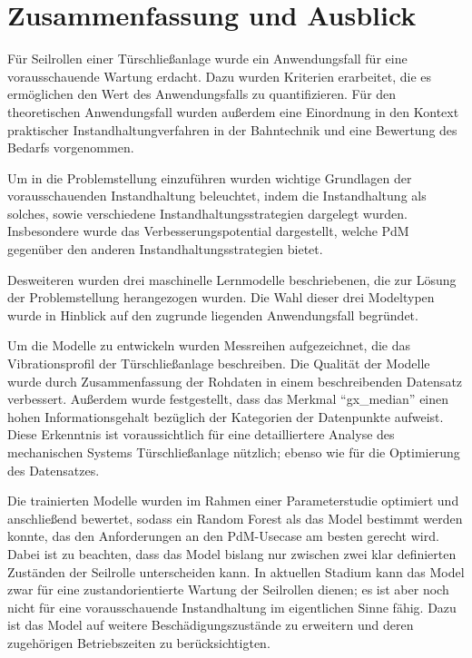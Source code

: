 \chapter{Zusammenfassung und Ausblick}
\label{ch:fazit}
Für Seilrollen einer Türschließanlage wurde ein Anwendungsfall für eine vorausschauende Wartung erdacht. Dazu wurden Kriterien erarbeitet, die es ermöglichen den Wert des Anwendungsfalls zu quantifizieren. Für den theoretischen Anwendungsfall wurden außerdem eine Einordnung in den Kontext praktischer Instandhaltungverfahren in der Bahntechnik und eine Bewertung des Bedarfs vorgenommen.

Um in die Problemstellung einzuführen wurden wichtige Grundlagen der vorausschauenden Instandhaltung beleuchtet, indem die Instandhaltung als solches, sowie verschiedene Instandhaltungsstrategien dargelegt wurden. Insbesondere wurde das Verbesserungspotential dargestellt, welche PdM gegenüber den anderen Instandhaltungsstrategien bietet.

Desweiteren wurden drei maschinelle Lernmodelle beschriebenen, die zur Lösung der Problemstellung herangezogen wurden. Die Wahl dieser drei Modeltypen wurde in Hinblick auf den zugrunde liegenden Anwendungsfall begründet. 

Um die Modelle zu entwickeln wurden Messreihen aufgezeichnet, die das Vibrationsprofil der Türschließanlage beschreiben. Die Qualität der Modelle wurde durch Zusammenfassung der Rohdaten in einem beschreibenden Datensatz verbessert. Außerdem wurde festgestellt, dass das Merkmal \enquote{gx\_median} einen hohen Informationsgehalt bezüglich der Kategorien der Datenpunkte aufweist. Diese Erkenntnis ist voraussichtlich für eine detailliertere Analyse des mechanischen Systems Türschließanlage nützlich; ebenso wie für die Optimierung des Datensatzes.

Die trainierten Modelle wurden im Rahmen einer Parameterstudie optimiert und anschließend bewertet, sodass ein Random Forest als das Model bestimmt werden konnte, das den Anforderungen an den PdM-Usecase am besten gerecht wird. Dabei ist zu beachten, dass das Model bislang nur zwischen zwei klar definierten Zuständen der Seilrolle unterscheiden kann. In aktuellen Stadium kann das Model zwar für eine zustandorientierte Wartung der Seilrollen dienen; es ist aber noch nicht für eine vorausschauende Instandhaltung im eigentlichen Sinne fähig. Dazu ist das Model auf weitere Beschädigungszustände zu erweitern und deren zugehörigen Betriebszeiten zu berücksichtigten.
